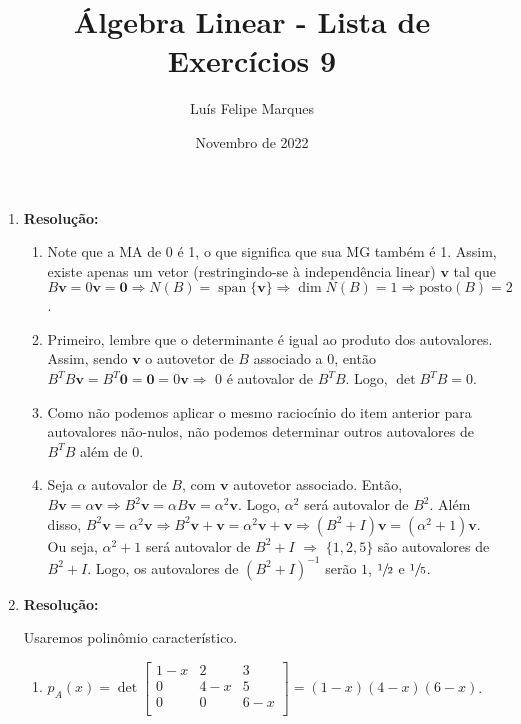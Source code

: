 \documentclass[leqno]{article}
\title{Álgebra Linear - Lista de Exercícios 9}
\author{Luís Felipe Marques}
\date{Novembro de 2022}
\DeclareMathOperator{\spn}{span}
\newcommand{\pst}[1]{\text{posto}(#1)}
\begin{document}
 
\maketitle

\begin{enumerate}
    \item 
    
    \textbf{Resolução:}
    
    \begin{enumerate}
        \item Note que a MA de 0 é 1, o que significa que sua MG também é 1. Assim, existe apenas um vetor (restringindo-se à independência linear) $\textbf{v}$ tal que $B\textbf{v}=0\textbf{v}=\textbf{0}\Rightarrow N(B)=\spn \{\textbf{v}\}\Rightarrow \dim N(B)=1\Rightarrow \pst{B}=2$.
        
        \item Primeiro, lembre que o determinante é igual ao produto dos autovalores. Assim, sendo $\textbf{v}$ o autovetor de $B$ associado a $0$, então $B^TB\textbf{v}=B^T\textbf{0}=\textbf{0}=0\textbf{v}\Rightarrow$ $0$ é autovalor de $B^TB$. Logo, $\det B^TB=0$.
        
        \item Como não podemos aplicar o mesmo raciocínio do item anterior para autovalores não-nulos, não podemos determinar outros autovalores de $B^TB$ além de $0$.
        
        \item Seja $\alpha$ autovalor de $B$, com $\textbf{v}$ autovetor associado. Então, $B\textbf{v}=\alpha\textbf{v}\Rightarrow B^2\textbf{v}=\alpha B\textbf{v}=\alpha^2\textbf{v}$. Logo, $\alpha^2$ será autovalor de $B^2$. Além disso, $B^2\textbf{v}=\alpha^2\textbf{v}\Rightarrow B^2\textbf{v}+\textbf{v}=\alpha^2\textbf{v}+\textbf{v}\Rightarrow (B^2+I)\textbf{v}=(\alpha^2+1)\textbf{v}$. Ou seja, $\alpha^2+1$ será autovalor de $B^2+I$ $\Rightarrow$ $\{1, 2, 5\}$ são autovalores de $B^2+I$. Logo, os autovalores de $(B^2+I)^{-1}$ serão $1$, $\sfrac{1}{2}$ e $\sfrac{1}{5}$. 
    \end{enumerate}
    
    \item 
    
    \textbf{Resolução:}

    Usaremos polinômio característico.
    
    \begin{enumerate}
        \item $p_A(x)=\det \begin{bmatrix}
            1-x & 2 & 3\\
            0 & 4-x & 5\\
            0 & 0 & 6-x\\
        \end{bmatrix}=(1-x)(4-x)(6-x)$.
        

\end{enumerate}
\end{enumerate}
\end{document}
